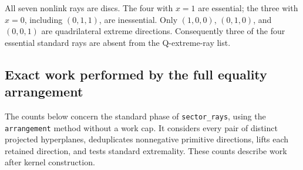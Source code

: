 \begin{corollary}
\label{fib:non-q-discs}
All seven nonlink rays are discs.  The four with \(x=1\) are essential;
the three with \(x=0\), including \((0,1,1)\), are inessential.
Only \((1,0,0)\), \((0,1,0)\), and \((0,0,1)\) are quadrilateral
extreme directions.  Consequently three of the four essential standard
rays are absent from the Q-extreme-ray list.
\end{corollary}

\subsection{Exact work performed by the full equality arrangement}
\label{fib:arrangement}

The counts below concern the standard phase of \texttt{sector\_rays},
using the \texttt{arrangement} method without a work cap.  It considers
every pair of distinct projected hyperplanes, deduplicates nonnegative
primitive directions, lifts each retained direction, and tests standard
extremality.  These counts describe work after kernel construction.

